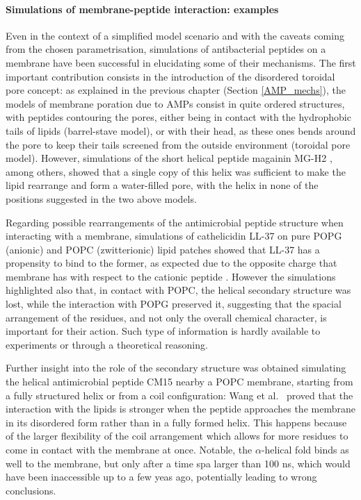 \paragraph{Simulations of membrane-peptide interaction: examples} Even in the context of a simplified model scenario and with the caveats coming from the chosen parametrisation, simulations of antibacterial peptides on a membrane have been successful in elucidating some of their mechanisms.
%
The first important contribution consists in the introduction of the disordered toroidal pore concept: as explained in the previous chapter (Section \ref{AMP_mechs}), the models of membrane poration due to AMPs consist in quite ordered structures, with peptides contouring the pores, either being in contact with the hydrophobic tails of lipids (barrel-stave model), or with their head, as these ones bends around the pore to keep their tails screened from the outside environment (toroidal pore model). However, simulations of the short helical peptide magainin MG-H2 \cite{Leontiadou2006}, among others, showed that a single copy of this helix was sufficient to make the lipid rearrange and form a water-filled pore, with the helix in none of the positions suggested in the two above models.

Regarding possible rearrangements of the antimicrobial peptide structure when interacting with a membrane, simulations of cathelicidin LL-37 on pure POPG (anionic) and POPC (zwitterionic) lipid patches showed that LL-37 has a propensity to bind to the former, as expected due to the opposite charge that membrane has with respect to the cationic peptide \cite{Zhao2018}. However the simulations highlighted also that, in contact with POPC, the helical secondary structure was lost, while the interaction with POPG preserved it, suggesting that the spacial arrangement of the residues, and not only the overall chemical character, is important for their action. Such type of information is hardly available to experiments or through a theoretical reasoning.

Further insight into the role of the secondary structure was obtained simulating the helical antimicrobial peptide CM15 nearby a POPC membrane, starting from a fully structured helix or from a coil configuration: Wang et al.\ \cite{Wang2012} proved that the interaction with the lipids is stronger when the peptide approaches the membrane in its disordered form rather than in a fully formed helix. This happens because of the larger flexibility of the coil arrangement which allows for more residues to come in contact with the membrane at once. Notable, the $\alpha$-helical fold binds as well to the membrane, but only after a time spa larger than 100 ns, which would have been inaccessible up to a few yeas ago, potentially leading to wrong conclusions.


